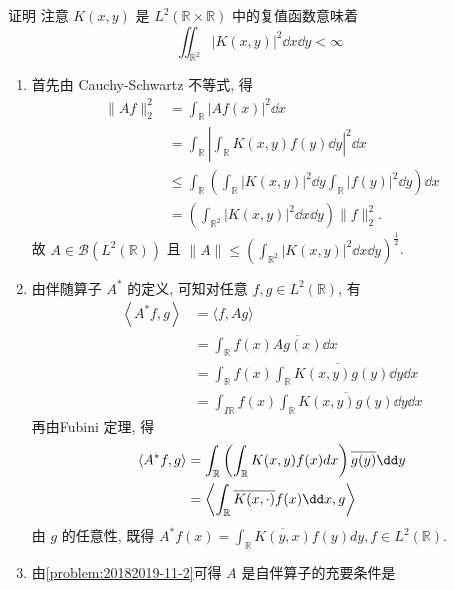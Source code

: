 \begin{enumerate}
    \begin{answer}
        证明 注意 $K(x, y)$ 是 $L^{2}(\mathbb{R} \times \mathbb{R})$ 中的复值函数意味着
        \[
        \iint_{\mathbb{R}^{2}}|K(x, y)|^{2} \dd{x}\dd{y}<\infty
        \]
        \begin{enumerate}
            \item 首先由 Cauchy-Schwartz 不等式, 得
            \[
            \begin{aligned}
            \|A f\|_{2}^{2}&=\int_{\mathbb{R}}|A f(x)|^{2} \dd{x}\\
            &=\int_{\mathbb{R}}\left|\left.\int_{\mathbb{R}} K(x, y) f(y) \dd{y}\right|^{2} \dd{x}\right.\\
            & \leq \int_{\mathbb{R}}\left(\int_{\mathbb{R}}|K(x, y)|^{2} \dd{y} \int_{\mathbb{R}}|f(y)|^{2} \dd{y}\right) \dd{x}\\
            &=\left(\int_{\mathbb{R}^{2}}|K(x, y)|^{2} \dd{x}\dd{y}\right)\|f\|_{2}^{2} .
            \end{aligned}
            \]
            故 $A \in \mathcal{B}\left(L^{2}(\mathbb{R})\right)$ 且 $\|A\| \leq\left(\int_{\mathbb{R}^{2}}\left| K(x, y)\right|^{2} \dd{x}\dd{y}\right)^{\frac{1}{2}}$.
            \item\label{problem:20182019-11-2} 由伴随算子 $A^{*}$ 的定义, 可知对任意 $f, g \in L^{2}(\mathbb{R})$, 有
            \[
            \begin{aligned}
            \left\langle A^{*} f, g\right\rangle &=\langle f, A g\rangle \\
            &=\int_{\mathbb{R}} f(x) \overline{A g(x)} \dd x \\
            &=\int_{\mathbb{R}} f(x) \overline{\int_{\mathbb{R}} K(x, y) g(y) \dd y} \dd x \\
            &=\int_{I \mathbb{R}} f(x) \int_{\mathbb{R}}\overline{ K(x, y) g(y) }\dd y \dd x
            \end{aligned}
            \]
            再由Fubini 定理, 得
            \[
            \begin{aligned}
            \left\langle A^{*} f, g\right\rangle &=\int_{\mathbb{R}}\left(\int_{\mathbb{R}} K(x, y) f(x) d x\right) \overline{g(y)} \dd y  \\
            &=\left\langle\int_{\mathbb{R}} \overline{K(x, \cdot)} f(x) \dx, g\right\rangle
            \end{aligned}
            \]
            由 $g$ 的任意性, 既得 $A^{*} f(x)=\int_{\mathbb{R}} \overline{K(y, x)} f(y) d y, f \in L^{2}(\mathbb{R})$.
            \item 由\ref{problem:20182019-11-2}可得 $A$ 是自伴算子的充要条件是 

\end{enumerate}
\end{answer}
\end{enumerate}
